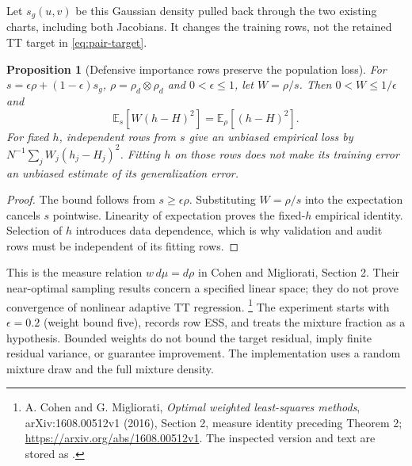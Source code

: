 \documentclass[11pt]{article}
\newtheorem{proposition}{Proposition}
\begin{document}
Let $s_g(u,v)$ be this Gaussian density pulled back through the two existing
charts, including both Jacobians. It changes the training rows, not the
retained TT target in \eqref{eq:pair-target}.
\begin{proposition}[Defensive importance rows preserve the population loss]
\label{prop:pair-importance}
For $s=\epsilon\rho+(1-\epsilon)s_g$, $\rho=\rho_d\otimes\rho_d$ and
$0<\epsilon\leq1$, let $W=\rho/s$. Then $0<W\leq1/\epsilon$ and
\begin{equation}
 \mathbb E_s[W(h-H)^2]=\mathbb E_\rho[(h-H)^2].
 \label{eq:pair-importance-unbiased}
\end{equation}
For fixed $h$, independent rows from $s$ give an unbiased empirical loss by
$N^{-1}\sum_j W_j(h_j-H_j)^2$. Fitting $h$ on those rows does not make its
training error an unbiased estimate of its generalization error.
\end{proposition}
\begin{proof}
The bound follows from $s\geq\epsilon\rho$. Substituting $W=\rho/s$ into the
expectation cancels $s$ pointwise. Linearity of expectation proves the fixed-$h$
empirical identity. Selection of $h$ introduces data dependence, which is why
validation and audit rows must be independent of its fitting rows.
\end{proof}

This is the measure relation $w\,d\mu=d\rho$ in Cohen and Migliorati,
Section 2. Their near-optimal sampling results concern a specified linear
space; they do not prove convergence of nonlinear adaptive TT regression.
\footnote{A. Cohen and G. Migliorati, \emph{Optimal weighted least-squares
methods}, arXiv:1608.00512v1 (2016), Section 2, measure identity preceding
Theorem 2; \url{https://arxiv.org/abs/1608.00512v1}. The inspected version and
text are stored as
.}
The experiment starts with $\epsilon=0.2$ (weight bound five), records row ESS,
and treats the mixture fraction as a hypothesis. Bounded weights do not bound
the target residual, imply finite residual variance, or guarantee improvement.
The implementation uses a random mixture draw and the full mixture density.
\end{document}
